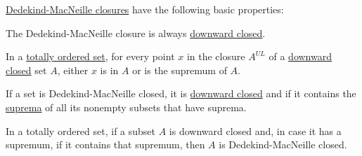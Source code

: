 \begin{proposition}\label{thm:def:dedekind_macnielle_closure}
  \hyperref[def:dedekind_macnielle_completion]{Dedekind-MacNeille closures} have the following basic properties:
  \begin{thmenum}
     The Dedekind-MacNeille closure is always \hyperref[def:closed_ordered_subset]{downward closed}.

     In a \hyperref[def:totally_ordered_set]{totally ordered set}, for every point \( x \) in the closure \( A^{UL} \) of a \hyperref[def:closed_ordered_subset]{downward closed} set \( A \), either \( x \) is in \( A \) or is the supremum of \( A \).

     If a set is Dedekind-MacNeille closed, it is \hyperref[def:closed_ordered_subset]{downward closed} and if it contains the \hyperref[def:extremal_points/supremum_and_infimum]{suprema} of all its nonempty subsets that have suprema.

     In a totally ordered set, if a subset \( A \) is downward closed and, in case it has a supremum, if it contains that supremum, then \( A \) is Dedekind-MacNeille closed.
  \end{thmenum}
\end{proposition}
